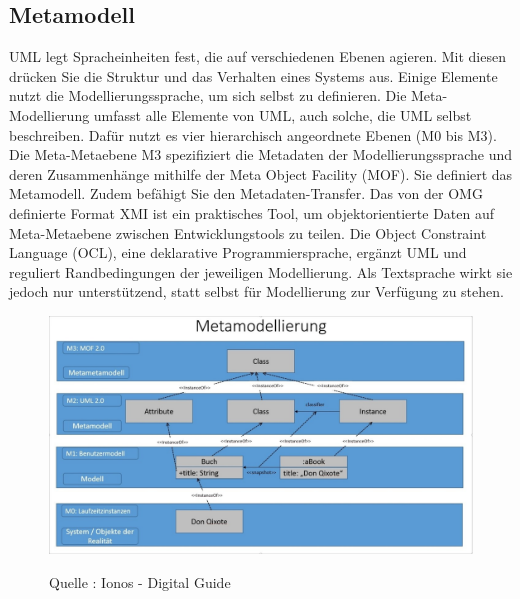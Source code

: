 \subsection{Metamodell}
UML legt Spracheinheiten fest, die auf verschiedenen Ebenen agieren. Mit diesen drücken Sie die Struktur und das Verhalten eines Systems aus. Einige Elemente nutzt die Modellierungssprache, um sich selbst zu definieren. Die Meta-Modellierung umfasst alle Elemente von UML, auch solche, die UML selbst beschreiben. Dafür nutzt es vier hierarchisch angeordnete Ebenen (M0 bis M3).\\

Die Meta-Metaebene M3 spezifiziert die Metadaten der Modellierungssprache und deren Zusammenhänge mithilfe der Meta Object Facility (MOF). Sie definiert das Metamodell. Zudem befähigt Sie den Metadaten-Transfer. Das von der OMG definierte Format XMI ist ein praktisches Tool, um objektorientierte Daten auf Meta-Metaebene zwischen Entwicklungstools zu teilen. Die Object Constraint Language (OCL), eine deklarative Programmiersprache, ergänzt UML und reguliert Randbedingungen der jeweiligen Modellierung. Als Textsprache wirkt sie jedoch nur unterstützend, statt selbst für Modellierung zur Verfügung zu stehen.\\

\begin{center}
\begin{figure}[h]
   
\includegraphics[scale=1]{Graphics/metamodell.jpg} 



Quelle : Ionos - Digital Guide

\label{fig1}


\end{figure}
\end{center}
\newpage

